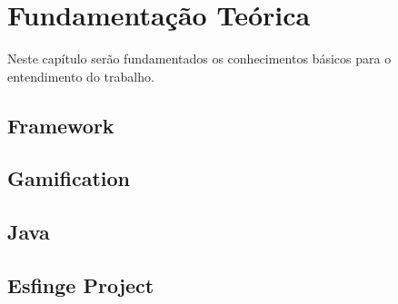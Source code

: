 \chapter{Fundamentação Teórica}
\label{ch:fundamentacao}
\par Neste capítulo ser\~ao fundamentados os conhecimentos b\'asicos para o entendimento do trabalho.
\section{Framework}
\section{Gamification}
\section{Java}
\section{Esfinge Project}